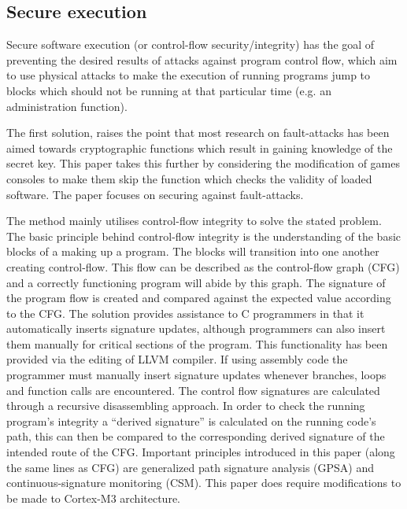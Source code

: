 \subsection{Secure execution}\label{secureExecutionSolutions}

Secure software execution (or control-flow security/integrity) has the goal of preventing the desired results of attacks against program control flow, which aim to use physical attacks to make the execution of running programs jump to blocks which should not be running at that particular time (e.g. an administration function).

The first solution, \cite{Werner2016} raises the point that most research on fault-attacks has been aimed towards cryptographic functions which result in gaining knowledge of the secret key. This paper takes this further by considering the modification of games consoles to make them skip the function which checks the validity of loaded software. The paper focuses on securing against fault-attacks.

The method mainly utilises control-flow integrity to solve the stated problem. The basic principle behind control-flow integrity is the understanding of the basic blocks of a making up a program. The blocks will transition into one another creating control-flow. This flow can be described as the control-flow graph (CFG) and a correctly functioning program will abide by this graph. The signature of the program flow is created and compared against the expected value according to the CFG. The solution provides assistance to C programmers in that it automatically inserts signature updates, although programmers can also insert them manually for critical sections of the program. This functionality has been provided via the editing of LLVM compiler. If using assembly code the programmer must manually insert signature updates whenever branches, loops and function calls are encountered. The control flow signatures are calculated through a  recursive disassembling approach. In order to check the running  program's integrity a ``derived signature'' is calculated on the running code's path, this can then be compared to the corresponding derived signature of the intended route of the CFG. Important principles introduced in this paper (along the same lines as CFG) are generalized path signature analysis (GPSA) and continuous-signature monitoring (CSM). This paper does require modifications to be made to Cortex-M3 architecture.

\ifnotesincluded
{} 

